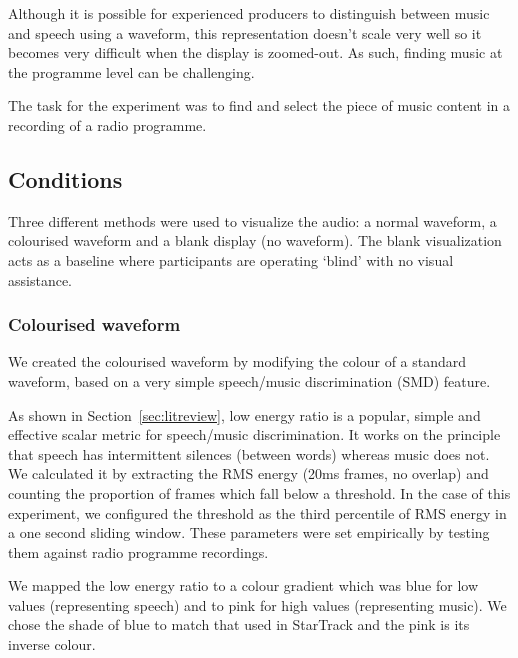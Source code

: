 Although it is possible for experienced producers to distinguish between music and speech using a waveform, this
representation doesn't scale very well so it becomes very difficult when the display is zoomed-out. As such, finding
music at the programme level can be challenging.

The task for the experiment was to find and select the piece of music content in a recording of a radio programme.

\subsection{Conditions}
Three different methods were used to visualize the audio: a normal waveform, a colourised waveform and a blank
display (no waveform). The blank visualization acts as a baseline where participants are operating `blind' with no
visual assistance.



\subsubsection{Colourised waveform}\label{sec:studywaveform}
We created the colourised waveform by modifying the colour of a standard waveform, based on a very simple speech/music
discrimination (SMD) feature.

As shown in Section~\ref{sec:litreview}, low energy ratio is a popular, simple and effective scalar metric for
speech/music discrimination. It works on the principle that speech has intermittent silences (between words) whereas
music does not. We calculated it by extracting the RMS energy (20ms frames, no overlap) and counting the proportion of
frames which fall below a threshold.  In the case of this experiment, we configured the threshold as the third
percentile of RMS energy in a one second sliding window. These parameters were set empirically by testing them against
radio programme recordings.

We mapped the low energy ratio to a colour gradient which was blue for low values (representing speech) and to pink
for high values (representing music). We chose the shade of blue to match that used in StarTrack and the pink is
its inverse colour.

